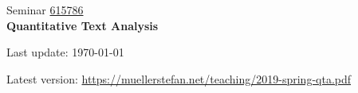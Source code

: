 \documentclass[abstract=on,parskip=full,headings=standardclasses,fontsize=11pt,paper=a4]{scrartcl}
\begin{document}
	
\singlespacing

\noindent
{}%
\hfill%

\singlespacing
\vspace{1cm}

\begin{center}
{\large Seminar \href{https://studentservices.uzh.ch/uzh/anonym/vvz/index.html#/details/2018/004/SM/50926554}{615786}} \\ 
\medskip
{\Large \textbf{Quantitative Text Analysis}} 
\bigskip


{\large  {Last update: \today}}\\
\bigskip

Latest version: \url{https://muellerstefan.net/teaching/2019-spring-qta.pdf}
\end{center}

\vspace{1.5cm}
\end{document}
